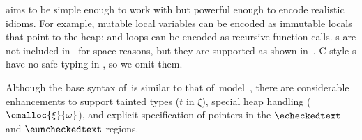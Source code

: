 % 
\lang{} aims to be simple enough to work with but powerful enough to
encode realistic \systemname idioms. For example, mutable local
  variables can be encoded as immutable locals that point to the heap;
% 
and loops can be encoded as recursive function calls. s are
not included in~ for space reasons, but they are
supported as shown in~.
C-style s have no safe typing in \checkedc, so we omit them.


Although the base syntax of~\lang is similar to that of~\checkedc model~\cite{li22checkedc}, there are considerable enhancements to support tainted types ($t$ in $\xi$), special heap handling (\ie $\emalloc{\xi}{\omega}$), and explicit specification of pointers in the $\echeckedtext$ and $\euncheckedtext$ regions.

